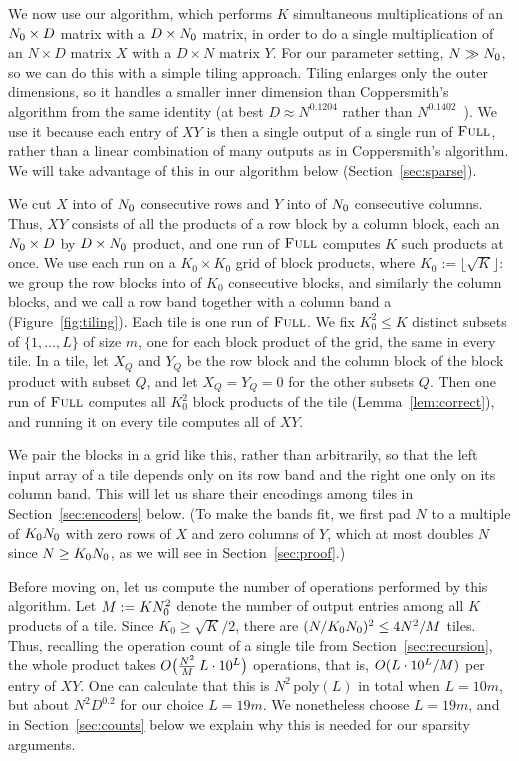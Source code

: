 We now use our algorithm, which performs $K$ simultaneous multiplications of an $N_0 \times D$ matrix with a $D \times N_0$ matrix, in order to do a single multiplication of an $N \times D$ matrix $X$ with a $D \times N$ matrix $Y$. For our parameter setting, $N \gg N_0$, so we can do this with a simple tiling approach. Tiling enlarges only the outer dimensions, so it handles a smaller inner dimension than Coppersmith's algorithm from the same identity (at best $D\approx N^{0.1204}$ rather than $N^{0.1402}$~\cite{Cop82}). We use it because each entry of $XY$ is then a single output of a single run of $\textnormal{\textsc{Full}}$, rather than a linear combination of many outputs as in Coppersmith's algorithm. We will take advantage of this in our algorithm below (Section~\ref{sec:sparse}).

We cut $X$ into  of $N_0$ consecutive rows and $Y$ into  of $N_0$ consecutive columns. Thus, $XY$ consists of all the products of a row block by a column block, each an $N_0\times D$ by $D\times N_0$ product, and one run of $\textnormal{\textsc{Full}}$ computes $K$ such products at once. We use each run on a $K_0\times K_0$ grid of block products, where $K_0:=\lfloor\sqrt K\rfloor$: we group the row blocks into  of $K_0$ consecutive blocks, and similarly the column blocks, and we call a row band together with a column band a  (Figure~\ref{fig:tiling}). Each tile is one run of $\textnormal{\textsc{Full}}$. We fix $K_0^2\le K$ distinct subsets of $\{1,\dots,L\}$ of size $m$, one for each block product of the grid, the same in every tile. In a tile, let $X_Q$ and $Y_Q$ be the row block and the column block of the block product with subset $Q$, and let $X_Q=Y_Q=0$ for the other subsets $Q$. Then one run of $\textnormal{\textsc{Full}}$ computes all $K_0^2$ block products of the tile (Lemma~\ref{lem:correct}), and running it on every tile computes all of $XY$.

We pair the blocks in a grid like this, rather than arbitrarily, so that the left input array of a tile depends only on its row band and the right one only on its column band. This will let us share their encodings among tiles in Section~\ref{sec:encoders} below. (To make the bands fit, we first pad $N$ to a multiple of $K_0N_0$ with zero rows of $X$ and zero columns of $Y$, which at most doubles $N$ since $N\ge K_0N_0$, as we will see in Section~\ref{sec:proof}.)

Before moving on, let us compute the number of operations performed by this algorithm. Let $M:=KN_0^2$ denote the number of output entries among all $K$ products of a tile. 
Since $K_0\ge\sqrt K/2$, there are $(N/K_0N_0)^2\le4N^2/M$ tiles. Thus, recalling the operation count of a single tile from Section~\ref{sec:recursion}, the whole product takes $O\big(\tfrac{N^2}{M}\,L\cdot10^L\big)$ operations, that is, $O(L\cdot10^L/M)$ per entry of $XY$. One can calculate that this is $N^2\,\mathrm{poly}(L)$ in total when $L=10m$, but about $N^2D^{0.2}$ for our choice $L=19m$. We nonetheless choose $L=19m$, and in Section~\ref{sec:counts} below we explain why this is needed for our sparsity arguments.


